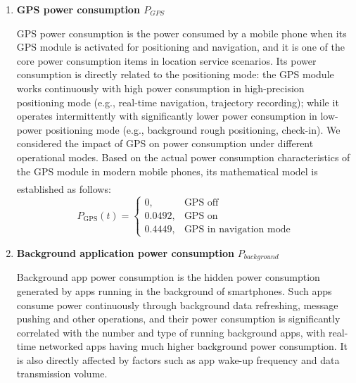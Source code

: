 \documentclass{mcmthesis}  %
\newcommand{\upcite}[1]{\textsuperscript{\textsuperscript{\cite{#1}}}}
\begin{document}
\begin{enumerate}[label=\bfseries\arabic*.]
		
		\item \textbf{GPS power consumption $P_{GPS}$}
		
		GPS power consumption is the power consumed by a mobile phone when its GPS module is activated for positioning and navigation, and it is one of the core power consumption items in location service scenarios. Its power consumption is directly related to the positioning mode: the GPS module works continuously with high power consumption in high-precision positioning mode (e.g., real-time navigation, trajectory recording); while it operates intermittently with significantly lower power consumption in low-power positioning mode (e.g., background rough positioning, check-in). We considered the impact of GPS on power consumption under different operational modes. Based on the actual power consumption characteristics of the GPS module in modern mobile phones, its mathematical model is established as follows\upcite{5}:
		\begin{equation}
			P_{\text{GPS}}(t) =
			\begin{cases}
				0, & \text{GPS off} \\
				0.0492, & \text{GPS on} \\
				0.4449, & \text{GPS in navigation mode}
			\end{cases}
		\end{equation}
		
		\item \textbf{Background application power consumption} $P_{background}$
		
		Background app power consumption is the hidden power consumption generated by apps running in the background of smartphones. Such apps consume power continuously through background data refreshing, message pushing and other operations, and their power consumption is significantly correlated with the number and type of running background apps, with real-time networked apps having much higher background power consumption. It is also directly affected by factors such as app wake-up frequency and data transmission volume.
		

\end{enumerate}
\end{document}
